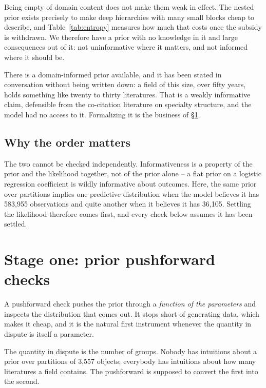 \documentclass[11pt]{article}
\begin{document}
Being empty of domain content does not make them weak in effect. The nested
prior exists precisely to make deep hierarchies with many small blocks cheap to
describe, and Table~\ref{tab:entropy} measures how much that costs once the
subsidy is withdrawn. We therefore have a prior with no knowledge in it and
large consequences out of it: not uninformative where it matters, and not
informed where it should be.

There is a domain-informed prior available, and it has been stated in
conversation without being written down: a field of this size, over fifty years,
holds something like twenty to thirty literatures. That is a weakly informative
claim, defensible from the co-citation literature on specialty structure, and
the model had no access to it. Formalizing it is the business of
\S\ref{sec:pushforward}.

\subsection{Why the order matters}

The two cannot be checked independently. Informativeness is a property of the
prior and the likelihood together, not of the prior alone -- a flat prior on a
logistic regression coefficient is wildly informative about outcomes. Here, the
same prior over partitions implies one predictive distribution when the model
believes it has 583{,}955 observations and quite another when it believes it has
36{,}105. Settling the likelihood therefore comes first, and every check below
assumes it has been settled.

\section{Stage one: prior pushforward checks}
\label{sec:pushforward}

A pushforward check pushes the prior through a \emph{function of the
parameters} and inspects the distribution that comes out. It stops short of
generating data, which makes it cheap, and it is the natural first instrument
whenever the quantity in dispute is itself a parameter.

The quantity in dispute is the number of groups. Nobody has intuitions about a
prior over partitions of 3{,}557 objects; everybody has intuitions about how
many literatures a field contains. The pushforward is supposed to convert the
first into the second.
\end{document}
